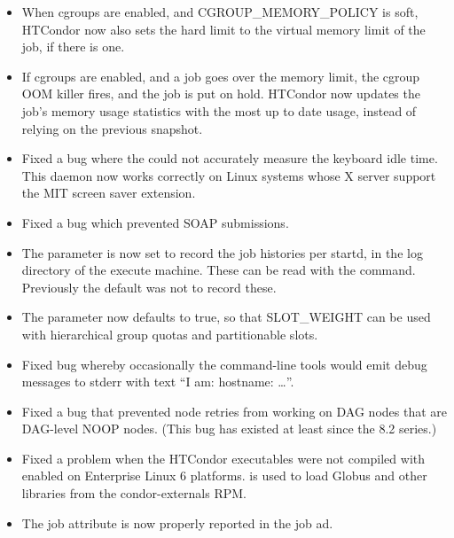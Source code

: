 \begin{itemize}

\item When cgroups are enabled, and CGROUP\_MEMORY\_POLICY is soft, 
HTCondor now also sets the hard limit to the virtual memory limit
of the job, if there is one.

\item If cgroups are enabled, and a job goes over the memory limit, the
cgroup OOM killer fires, and the job is put on hold.  HTCondor now
updates the job's memory usage statistics with the most up to date
usage, instead of relying on the previous snapshot.

\item Fixed a bug where the  could not accurately measure
the keyboard idle time.  This daemon now works correctly on Linux systems
whose X server support the MIT screen saver extension.

\item Fixed a bug which prevented SOAP submissions.

\item The parameter  is now set to record
the job histories per startd, in the log directory of the
execute machine. These can be read with the  command.
Previously the default was not to record these.

\item The parameter  now defaults to
true, so that SLOT\_WEIGHT can be used with hierarchical group quotas
and partitionable slots.

\item Fixed bug whereby occasionally the command-line tools would
	emit debug messages to stderr with text ``I am: hostname: \ldots''.

\item Fixed a bug that prevented node retries from working on DAG
nodes that are DAG-level NOOP nodes.  (This bug has existed at least since
the 8.2 series.)

\item Fixed a problem when the HTCondor executables were not compiled
with  enabled on Enterprise Linux 6 platforms.  is used
to load Globus and other libraries from the condor-externals RPM.

\item The job attribute  is now
properly reported in the job ad.


\end{itemize}
